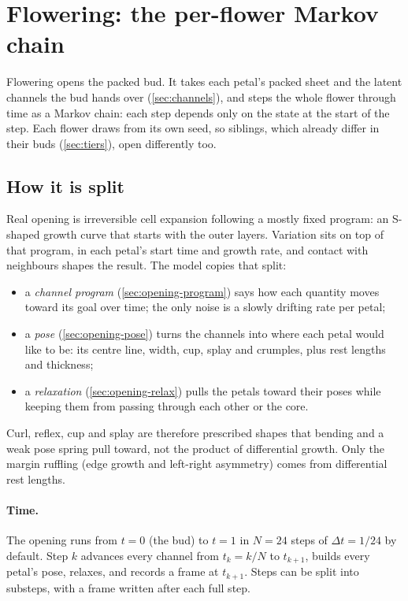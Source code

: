 \section{Flowering: the per-flower Markov chain}\label{sec:flowering}

Flowering opens the packed bud. It takes each petal's packed sheet and the
latent channels the bud hands over (\cref{sec:channels}), and steps the whole
flower through time as a Markov chain: each step depends only on the state at
the start of the step. Each flower draws from its own seed, so siblings,
which already differ in their buds (\cref{sec:tiers}), open differently too.

\subsection{How it is split}
Real opening is irreversible cell expansion following a mostly fixed program:
an S-shaped growth curve that starts with the outer layers. Variation sits on
top of that program, in each petal's start time and growth rate, and contact
with neighbours shapes the result. The model copies that split:
\begin{itemize}[leftmargin=*]
\item a \emph{channel program} (\cref{sec:opening-program}) says how each
  quantity moves toward its goal over time; the only noise is a slowly drifting
  rate per petal;
\item a \emph{pose} (\cref{sec:opening-pose}) turns the channels into where
  each petal would like to be: its centre line, width, cup, splay and
  crumples, plus rest lengths and thickness;
\item a \emph{relaxation} (\cref{sec:opening-relax}) pulls the petals toward
  their poses while keeping them from passing through each other or the core.
\end{itemize}
Curl, reflex, cup and splay are therefore prescribed shapes that bending and a
weak pose spring pull toward, not the product of differential growth. Only the
margin ruffling (edge growth and left-right asymmetry) comes from differential
rest lengths.

\paragraph{Time.} The opening runs from $t=0$ (the bud) to $t=1$ in
$N = 24$ steps of $\Delta t = 1/24$ by default. Step $k$ advances every channel
from $t_k = k/N$ to $t_{k+1}$, builds every petal's pose, relaxes, and records a
frame at $t_{k+1}$. Steps can be split into substeps, with a frame written
after each full step.

